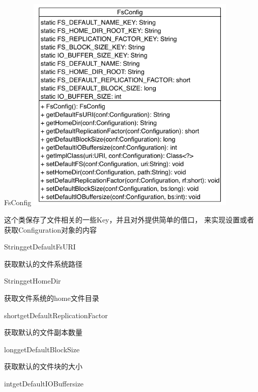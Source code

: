 \begin{XeClass}{FsConfig}
\includegraphics[width=10cm]{cdig/FsConfig.png}
     
 这个类保存了文件相关的一些Key，并且对外提供简单的借口，
 来实现设置或者获取Configuration对象的内容

    \begin{XeMethod}{\XePublic}{String}{getDefaultFsURI}
         
 获取默认的文件系统路径

    \end{XeMethod}

    \begin{XeMethod}{\XePublic}{String}{getHomeDir}
         
 获取文件系统的home文件目录

    \end{XeMethod}

    \begin{XeMethod}{\XePublic}{short}{getDefaultReplicationFactor}
         
 获取默认的文件副本数量

    \end{XeMethod}

    \begin{XeMethod}{\XePublic}{long}{getDefaultBlockSize}
         
 获取默认的文件块的大小

    \end{XeMethod}

    \begin{XeMethod}{\XePublic}{int}{getDefaultIOBuffersize}
         

\end{XeMethod}
\end{XeClass}
